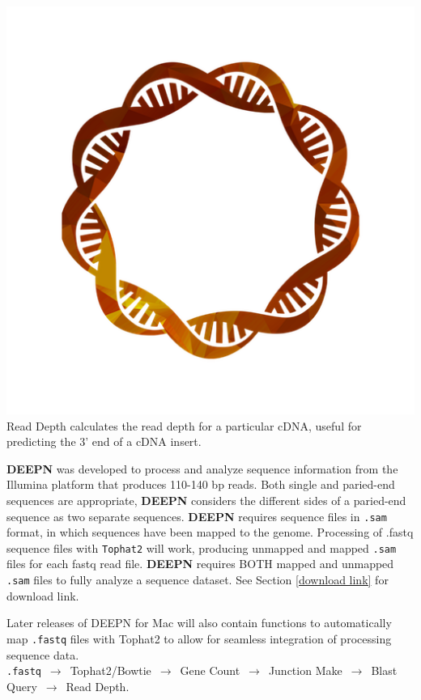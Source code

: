 \documentclass[11pt,fleqn]{book} %
\newcommand{\GeneCount}{{\color{Red} Gene Count }}
\newcommand{\ReadDepth}{{\color{Bittersweet} Read Depth }}
\newcommand{\DEEPN}{\textbf{DEEPN }}
\begin{document}
\includegraphics[scale=0.3]{Pictures/read_depth.png} \ReadDepth calculates the read depth for a particular cDNA, useful for \\predicting the 3’ end of a cDNA insert.

\vspace{15pt}

\DEEPN was developed to process and analyze sequence information from the Illumina platform that produces 110-140 bp reads.  Both single and paried-end sequences are appropriate, \DEEPN considers the different sides of a paried-end sequence as two separate sequences. \DEEPN requires sequence files in \texttt{.sam} format, in which sequences have been mapped to the genome.  Processing of .fastq sequence files with \texttt{Tophat2} will work, producing unmapped and mapped \texttt{.sam} files for each fastq read file. \DEEPN requires BOTH mapped and unmapped \texttt{.sam} files to fully analyze a sequence dataset. See Section \ref{download link} for download link.

\clearpage
\begin{remark}
	Later releases of DEEPN for Mac will also contain functions to automatically map \texttt{.fastq} files with Tophat2 to allow for seamless integration of processing sequence data.\\

	\texttt{.fastq} $\,\to\,$ Tophat2/Bowtie $\,\to\,$ \GeneCount $\,\to\,$ {\color{Blue} Junction Make} $\,\to\,$ {\color{ForestGreen} Blast Query} $\,\to\,$  {\color{Bittersweet} Read Depth}.  
\end{remark}
\end{document}
